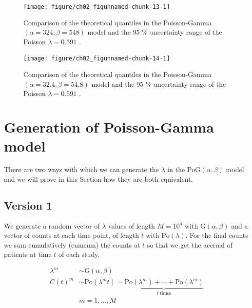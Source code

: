 \begin{figure}
\begin{knitrout}
\color{fgcolor}

{\centering \texttt{[image: figure/ch02\_figunnamed-chunk-13-1]} 

}


\end{knitrout}
  \caption{Comparison of the theoretical quantiles in the Poisson-Gamma $(\alpha = 324, \beta = 548)$ model and the 95 \% uncertainty range of the Poisson $\lambda = 0.591$ \citep{spiegelhalter2011visualizing, pkgacc}.}
  \label{fig:2_11}
\end{figure}


\begin{figure}
\begin{knitrout}
\color{fgcolor}

{\centering \texttt{[image: figure/ch02\_figunnamed-chunk-14-1]} 

}


\end{knitrout}
  \caption{Comparison of the theoretical quantiles in the Poisson-Gamma $(\alpha = 32.4, \beta = 54.8)$ model and the 95 \% uncertainty range of the Poisson $\lambda = 0.591$ \citep{spiegelhalter2011visualizing, pkgacc}.}
  \label{fig:2_11a}
\end{figure}

\section{Generation of Poisson-Gamma model}

There are two ways with which we can generate the $\lambda$ in the $\textrm{PoG}(\alpha, \beta)$ model and we will prove in this Section how they are both equivalent.

\subsection{Version 1}

We generate a random vector of $\lambda$ values of length $M=10^5$ with $\textrm{G}(\alpha, \beta)$ and a vector of counts at each time point, of length $t$ with $\textrm{Po}(\lambda)$. For the final counts we sum cumulatively (cumsum) the counts at $t$ so that we get the accrual of patients at time $t$ of each study.

\begin{align*}
\lambda^m &\sim \textrm{G}(\alpha, \beta) \\
C(t)^m &\sim \textrm{Po} (\lambda^m t) = \underbrace{\textrm{Po} (\lambda^m) +\cdots +\textrm{Po} (\lambda^m)}_{t \ \text{times}}\\
& m = 1, \ldots, M
\end{align*}

